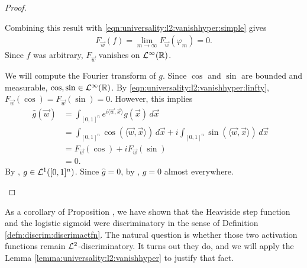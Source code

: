\begin{proof}
\begin{step}
Combining this result with \ref{eqn:universality:l2:vanishhyper:simple} gives
\begin{align}
   \label{eqn:universality:l2:vanishhyper:linfty}
   F_{\vec{w}}(f) = \lim_{m \to \infty} F_{\vec{w}}(\varphi_m) = 0.
\end{align}
Since $f$ was arbitrary, $F_\vec{w}$ vanishes on ${\mathcal {L}^\infty}({\mathbb R})$.
\end{step}
\begin{step}
We will compute the Fourier transform of $g$.
Since $\cos$ and $\sin$ are bounded and measurable, $\cos, \sin \in {\mathcal {L}^\infty}({\mathbb R})$. By \ref{eqn:universality:l2:vanishhyper:linfty}, $F_\vec{w}(\cos) = F_\vec{w}(\sin) = 0$. However, this implies  
\begin{align*}
    \widehat{g}(\vec{w}) &= \int_{[0,1]^n} e^{i \langle \vec{w}, \vec{x} \rangle } g(\vec{x}) \, d\vec{x} & \\
                           &=  \int_{[0,1]^n} \cos (\langle \vec{w}, \vec{x} \rangle) \,  d\vec{x} + i \int_{[0,1]^n} \sin (\langle \vec{w}, \vec{x} \rangle) \,  d\vec{x}  &\\
                           &= F_\vec{w}(\cos) + i F_\vec{w}(\sin) &\\
                           &= 0.
\end{align*}
By , $g \in {\mathcal {L}^1}([0,1]^n)$. Since $ \widehat{g} = 0$, by , $g = 0$ almost everywhere.
\end{step}
\end{proof}
As a corollary of Proposition , we have shown that the Heaviside step function and the logistic sigmoid were discriminatory in the sense of Definition \ref{defn:discrim:discrimactfn}. The natural question is whether those two activation functions remain ${\mathcal {L}^2}$-discriminatory. It turns out they do, and we will apply the Lemma \ref{lemma:universality:l2:vanishhyper} to justify that fact. 


